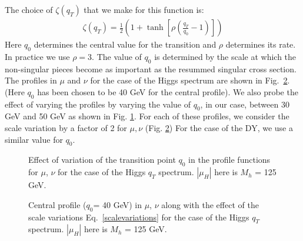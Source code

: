 \documentclass[a4,letterpaper,11pt]{article}
\newcommand{\bea}{\begin{eqnarray}}
\newcommand{\eea}{\end{eqnarray}}
\newcommand{\abs}[1]{\left\lvert #1\right\rvert}
\newcommand{\eq}[1]{Eq.~\eqref{#1}}
\newcommand{\fig}[1]{Fig.~\ref{fig:#1}}
\begin{document}
The choice of  $\zeta(q_T)$ that we make for this function is:
\bea
\zeta(q_T) =  \frac{1}{2} \left(1+\tanh \left[\rho\left(\frac{q_T}{q_0}-1\right)\right]\right)
\eea
Here $q_0$ determines the central value for the transition and $\rho$ determines its rate. 
In practice we use $\rho=3$. The value of $q_0$ is determined by the scale at which the non-singular pieces become as important as the resummed singular cross section. The profiles in $\mu$ and $\nu$ for the case of the Higgs spectrum are shown in \fig{profile}. (Here $q_0$ has been chosen to be 40 GeV for the central profile). We also probe the effect of varying the profiles by varying the value of $q_0$, in our case, between 30 GeV and 50 GeV as shown in Fig. \ref{profile_var}. For each of these profiles, we consider the scale variation by a factor of 2 for $\mu ,\nu$ (Fig. \ref{fig:profile})
For the case of the DY, we use a similar value for $q_0$.
\begin{figure}
\centerline{}
\vskip-0.5cm
\caption[1]{Effect of variation of the transition point $q_0$ in the profile functions for $\mu$, $\nu$  for the case of the Higgs $q_T$ spectrum. $\abs{\mu_H}$ here is $M_h$ = 125 GeV.}
\label{profile_var} 
\end{figure}

\begin{figure}
\centerline{}
\vskip-0.5cm
\caption[1]{Central profile ($q_0$= 40 GeV) in $\mu$, $\nu$ along with the effect of the scale variations \eq{scalevariations} for the case of the Higgs $q_T$ spectrum. $\abs{\mu_H}$ here is $M_h$ = 125 GeV.}
\label{fig:profile} 
\end{figure}
\end{document}
